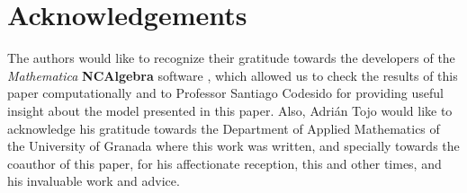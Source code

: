 \documentclass[a4paper,12pt,onecolumn]{article}
\theoremstyle{ptheorem}
\theoremstyle{hdef}
\theoremstyle{premark}
\numberwithin{equation}{section}
\numberwithin{figure}{section}
\newcommand{\<}{\langle}
\renewcommand{\>}{\rangle}
\renewcommand{\<}{\left<}
\renewcommand{\>}{\right>}
\renewcommand{\(}{\left(}
\renewcommand{\)}{\right)}
\begin{document}



\section*{Acknowledgements}
	The authors would like to recognize their gratitude towards the developers of the \textit{Mathematica} \textbf{NCAlgebra} software \cite{NCAlgebra}, which allowed us to check the results of this paper computationally and to Professor Santiago Codesido for providing useful insight about the model presented in this paper. Also, Adri\'an Tojo would like to acknowledge his gratitude towards the Department of Applied Mathematics of the University of Granada where this work was written, and specially towards the coauthor
	of this paper, for his affectionate reception, this and other times, and his invaluable work and advice.
\end{document}
